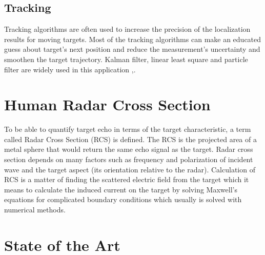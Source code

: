 \subsection{Tracking}
Tracking algorithms are often used to increase the precision of the localization results for moving targets. Most of the tracking algorithms can make an educated guess about target's next position and reduce the measurement's uncertainty and smoothen the target trajectory. Kalman filter, linear least square and particle filter are widely used in this application \cite{Denis},\cite{Sobhani2014}.

\section{Human Radar Cross Section}
To be able to quantify target echo in terms of  the target characteristic, a term called Radar Cross Section (RCS) is defined. The RCS is the projected area of a metal sphere that would return the same echo signal as the target.
Radar cross section depends on many factors such as frequency and polarization of incident wave and the target aspect (its orientation relative to the radar). Calculation of RCS is a matter of finding the scattered electric field from the target which it means to calculate the induced current on the target by solving Maxwell's equations for complicated boundary conditions which usually is solved with numerical methods.
\section{State of the Art}


